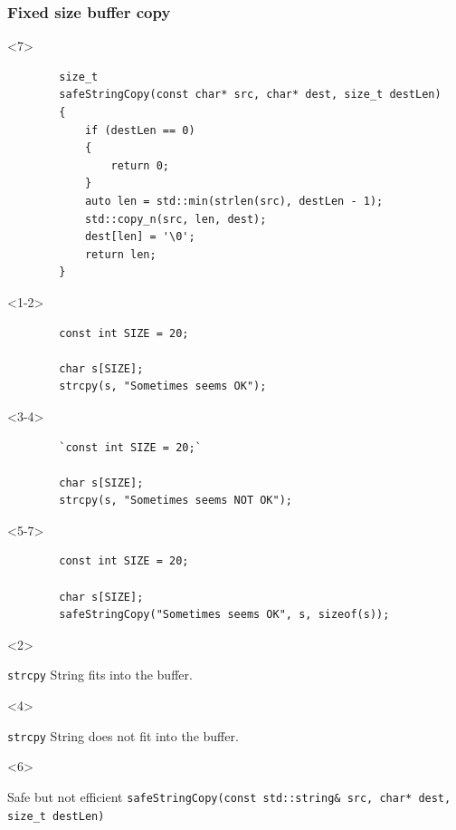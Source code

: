 \documentclass{beamer}
\begin{document}
\begin{frame}[fragile,t]
\frametitle{Fixed size buffer copy}
    \begin{onlyenv}<7>
    \begin{lstlisting}
        size_t
        safeStringCopy(const char* src, char* dest, size_t destLen)
        {
            if (destLen == 0)
            {
                return 0;
            }
            auto len = std::min(strlen(src), destLen - 1);
            std::copy_n(src, len, dest);
            dest[len] = '\0';
            return len;
        }
    \end{lstlisting}
    \end{onlyenv}

    \begin{onlyenv}<1-2>
    \begin{lstlisting}
        const int SIZE = 20;

        char s[SIZE];
        strcpy(s, "Sometimes seems OK");
    \end{lstlisting}
    \end{onlyenv}

    \begin{onlyenv}<3-4>
    \begin{lstlisting}
        `const int SIZE = 20;`

        char s[SIZE];
        strcpy(s, "Sometimes seems NOT OK");
    \end{lstlisting}
    \end{onlyenv}

    \begin{onlyenv}<5-7>
    \begin{lstlisting}
        const int SIZE = 20;

        char s[SIZE];
        safeStringCopy("Sometimes seems OK", s, sizeof(s));
    \end{lstlisting}
    \end{onlyenv}

    \begin{onlyenv}<2>
    \begin{block}{\texttt{strcpy}}
        String fits into the buffer.
    \end{block}
    \end{onlyenv}

    \begin{onlyenv}<4>
    \begin{alertblock}{\texttt{strcpy}}
        String does not fit into the buffer.
    \end{alertblock}
    \end{onlyenv}

    \begin{onlyenv}<6>
    \begin{block}{Safe but not efficient}
        \texttt{safeStringCopy(const std::string\& src, char* dest, size\_t destLen)}
    \end{block}
    \end{onlyenv}
\end{frame}
\end{document}
